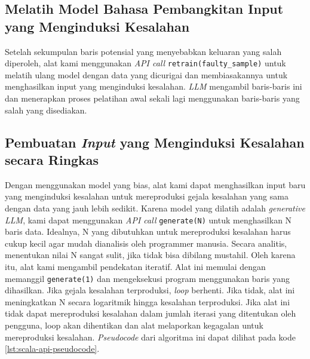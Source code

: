 \subsection{Melatih Model Bahasa Pembangkitan Input yang Menginduksi Kesalahan}
\label{sec:melatih model}

Setelah sekumpulan baris potensial yang menyebabkan keluaran 
yang salah diperoleh, alat kami menggunakan \emph{API call} 
{\tt retrain(faulty\_sample)} untuk melatih ulang model 
dengan data yang dicurigai dan membiasakannya untuk 
menghasilkan input yang menginduksi kesalahan. \emph{LLM} 
mengambil baris-baris ini dan menerapkan proses pelatihan 
awal sekali lagi menggunakan baris-baris yang salah yang 
disediakan. 







\subsection{Pembuatan \emph{Input} yang Menginduksi Kesalahan secara Ringkas}
\label{sec:pembuatan input}

Dengan menggunakan model yang bias, alat kami dapat 
menghasilkan input baru yang menginduksi kesalahan untuk 
mereproduksi gejala kesalahan yang sama dengan data yang 
jauh lebih sedikit. Karena model yang dilatih adalah 
\emph{generative LLM}, kami dapat menggunakan 
\emph{API call} {\tt generate(N)} untuk menghasilkan 
N baris data. Idealnya, N yang dibutuhkan untuk mereproduksi 
kesalahan harus cukup kecil agar mudah dianalisis oleh 
programmer manusia. Secara analitis, menentukan nilai N 
sangat sulit, jika tidak bisa dibilang mustahil. Oleh 
karena itu, alat kami mengambil pendekatan iteratif. 
Alat ini memulai dengan memanggil {\tt generate(1)} 
dan mengeksekusi program menggunakan baris yang dihasilkan. 
Jika gejala kesalahan terproduksi, \emph{loop} berhenti. Jika tidak, 
alat ini meningkatkan N secara logaritmik hingga kesalahan 
terproduksi. Jika alat ini tidak dapat mereproduksi kesalahan 
dalam jumlah iterasi yang ditentukan oleh pengguna, loop akan 
dihentikan dan alat melaporkan kegagalan untuk mereproduksi 
kesalahan. \emph{Pseudocode} dari algoritma ini dapat dilihat pada kode
\ref{lst:scala-api-pseudocode}.

